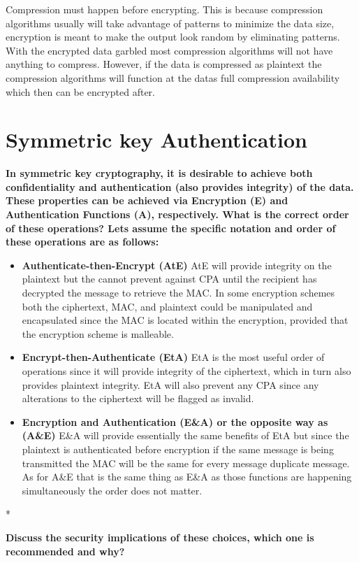 \documentclass[letterpaper,11pt,notitlepage,fleqn]{article}
\begin{document}
Compression must happen before encrypting. This is because compression algorithms usually will take advantage of patterns to minimize the data size, encryption is meant to make the output look random by eliminating patterns. With the encrypted data garbled most compression algorithms will not have anything to compress. However, if the data is compressed as plaintext the compression algorithms will function at the datas full compression availability which then can be encrypted after. 

\section{Symmetric key Authentication}
\noindent \textbf{In  symmetric  key  cryptography,  it  is  desirable  to  achieve  both  confidentiality  and authentication  (also  provides  integrity)  of  the  data.  These  properties  can  be  achieved  via Encryption (E) and Authentication Functions (A), respectively. What is the correct order of these operations? Lets assume the specific notation and order of these operations are as follows:} 
\begin{itemize}
    \item \textbf{Authenticate-then-Encrypt (AtE)}
        AtE will provide integrity on the plaintext but the cannot prevent against CPA until the recipient has decrypted the message to retrieve the MAC. In some encryption schemes both the ciphertext, MAC, and plaintext could be manipulated and encapsulated since the MAC is located within the encryption, provided that the encryption scheme is malleable. 
    \item \textbf{Encrypt-then-Authenticate (EtA)}
        EtA is the most useful order of operations since it will provide integrity of the ciphertext, which in turn also provides plaintext integrity. EtA will also prevent any CPA since any alterations to the ciphertext will be flagged as invalid. 
    \item \textbf{Encryption and Authentication (E\&A) or the opposite way as (A\&E)}
        E\&A will provide essentially the same benefits of EtA but since the plaintext is authenticated before encryption if the same message is being transmitted the MAC will be the same for every message duplicate message. As for A\&E that is the same thing as E\&A as those functions are happening simultaneously the order does not matter.  
\end{itemize}
*~\cite{oper}

\noindent \textbf{Discuss the security implications of these choices, which one is recommended and why?}
\end{document}
